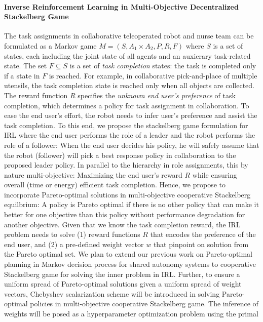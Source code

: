 \documentclass[letterpaper, 11 pt, onecolumn]{article}
\begin{document}
\paragraph*{Inverse Reinforcement Learning in Multi-Objective Decentralized Stackelberg Game}
The task assignments in collaborative teleoperated robot and
nurse team can be formulated as a Markov game $M=(S, A_1\times
A_2, P, R, F)$ where $S$ is a set of states, each including the joint
state of all agents and an auxierary task-related
state. The set $F\subseteq S$ is a set of \emph{task completion}
states: the task is completed only if a state in $F$ is reached. For
example, in collaborative pick-and-place of multiple utensils,
the task completion state is reached only when all objects are
collected.  The reward function $R$ specifies the \emph{unknown
end user's preference} of task completion, which determines a
policy for task assignment in collaboration. To ease the end
user's effort, the robot needs to infer user's preference and
assist the task completion. To this end, we propose the
stackelberg game formulation for IRL where the end user performs
the role of a leader and the robot performs the role of a
follower: When the end user decides his policy, he will safely
assume that the robot (follower) will pick a best response policy
in collaboration to the proposed leader policy. In parallel to the hierarchy in role assignments, this  by nature multi-objective: Maximizing the
end user's reward $R$ while ensuring overall (time or energy)
efficient task completion. Hence, we propose to incorporate
Pareto-optimal solutions in multi-objective cooperative
Stackelberg equilbrium: A policy is Pareto optimal if there is no
other policy that can make it better for one objective than this
policy without performance degradation for another objective.  Given that we know
the task completion reward, the IRL problem needs to solve (1)
reward functions $R$ that encodes the preference of the end user,
and (2) a pre-defined weight vector $w$ that pinpoint on solution
from the Pareto optimal set. We plan to extend our previous work on Pareto-optimal planning in Markov decision process for shared autonomy systems \cite{fu2016synthesis} to cooperative Stackelberg game for solving the inner problem in IRL. Further, to ensure a uniform spread of Pareto-optimal solutions given a uniform spread of weight vectors,  Chebyshev
scalarization scheme \cite{perny2010finding} will be introduced in solving  Pareto-optimal policies in multi-objective
cooperative Stackelberg game. The inference of weights will be posed as a hyperparameter optimization problem using the primal
\end{document}
